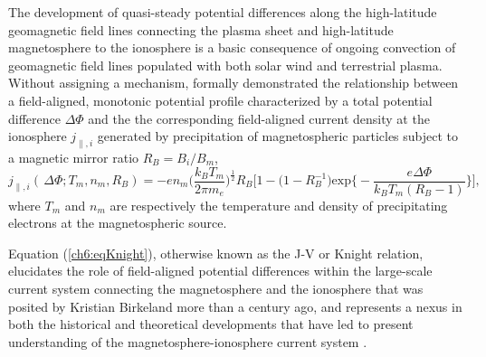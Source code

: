   The development of quasi-steady potential differences along the
  high-latitude geomagnetic field lines connecting the plasma sheet
  and high-latitude magnetosphere to the ionosphere is a basic
  consequence of ongoing convection of geomagnetic field lines
  populated with both solar wind and terrestrial plasma. Without
  assigning a mechanism, \citet{Knight1973} formally demonstrated the
  relationship between a field-aligned, monotonic potential profile
  characterized by a total potential difference $\Delta \Phi$ and the
  the corresponding field-aligned current density at the ionosphere
  $j_{\parallel,i}$ generated by precipitation of magnetospheric
  particles subject to a magnetic mirror ratio $R_B = B_{i} /
  B_{m}$,
    \begin{equation} \label{ch6:eqKnight} j_{\parallel,i} ( \, \Delta \Phi ;
      T_m, n_m, R_B ) = - e n_m \Big ( \frac{k_B T_m}{2 \pi m_e} \Big
      )^{\frac{1}{2}} R_B \Bigg [ 1 - \Big ( 1 - R_B^{-1} \Big )
      \textrm{exp} \Big \{ - \frac{e \Delta \Phi}{k_B T_m ( R_B - 1 )}
      \Big \} \Bigg],
    \end{equation}
  where $T_m$ and $n_m$ are respectively the temperature and density
  of precipitating electrons at the magnetospheric source.


  Equation (\ref{ch6:eqKnight}), otherwise known as the J-V or Knight
  relation, elucidates the role of field-aligned potential differences
  within the large-scale current system connecting the magnetosphere
  and the ionosphere that was posited by Kristian Birkeland more than
  a century ago, and represents a nexus in both the historical and
  theoretical developments that have led to present understanding of
  the magnetosphere-ionosphere current system
  \citep[e.g.,][]{Temerin1997,Hultqvist1999,Cowley2000,Bostrom2003a,Paschmann2003,Pierrard2007a,Karlsson2012}.

